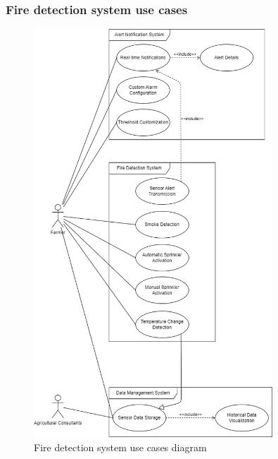 \subsubsection*{Fire detection system use cases}
\begin{figure}[H]
    \centering
    \includegraphics[width=0.8\textwidth]{./images/6/fire_uses.png}
    \caption{Fire detection system use cases diagram}
\end{figure}


